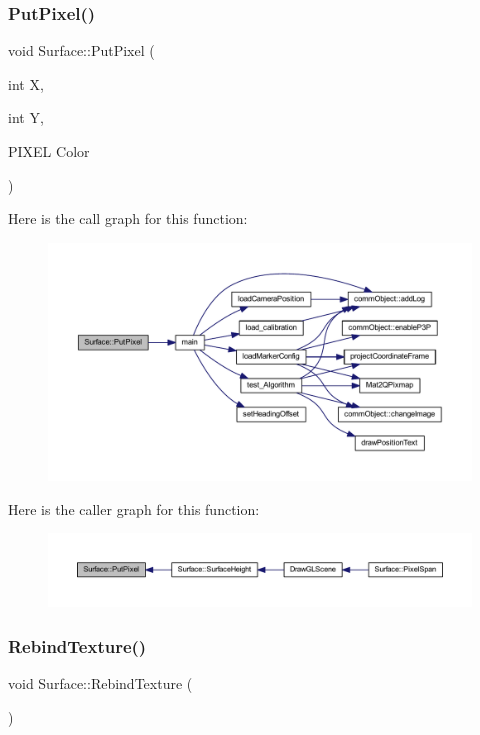 \subsubsection{\texorpdfstring{Put\+Pixel()}{PutPixel()}}
{\footnotesize\ttfamily void Surface\+::\+Put\+Pixel (\begin{DoxyParamCaption}\item[{int}]{X,  }\item[{int}]{Y,  }\item[{P\+I\+X\+EL}]{Color }\end{DoxyParamCaption})}

Here is the call graph for this function\+:\nopagebreak
\begin{figure}[H]
\begin{center}
\leavevmode
\includegraphics[width=350pt]{class_surface_a728571d0386e9690ce1760931562c72b_cgraph}
\end{center}
\end{figure}
Here is the caller graph for this function\+:\nopagebreak
\begin{figure}[H]
\begin{center}
\leavevmode
\includegraphics[width=350pt]{class_surface_a728571d0386e9690ce1760931562c72b_icgraph}
\end{center}
\end{figure}
\mbox{\label{class_surface_aa75c49f53fec5c49ba8422c0d64815e6}} 
\subsubsection{\texorpdfstring{Rebind\+Texture()}{RebindTexture()}}
{\footnotesize\ttfamily void Surface\+::\+Rebind\+Texture (\begin{DoxyParamCaption}{ }\end{DoxyParamCaption})}

